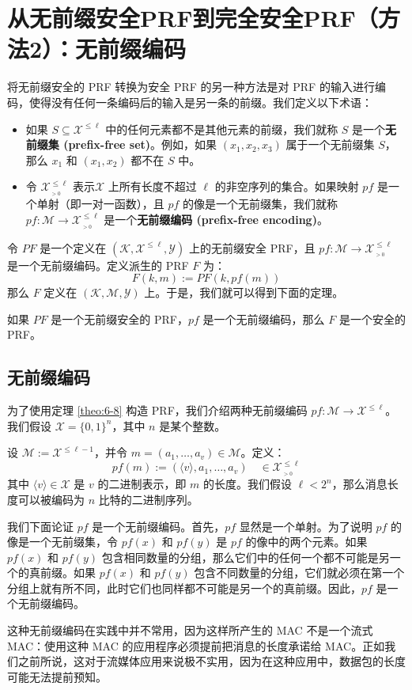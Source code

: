 \section{从无前缀安全PRF到完全安全PRF（方法2）：无前缀编码}\label{sec:6-6}

将无前缀安全的 PRF 转换为安全 PRF 的另一种方法是对 PRF 的输入进行编码，使得没有任何一条编码后的输入是另一条的前缀。我们定义以下术语：
\begin{itemize}
	\item 如果 $S\subseteq\mathcal{X}^{\leq\ell}$ 中的任何元素都不是其他元素的前缀，我们就称 $S$ 是一个\textbf{无前缀集 (prefix-free set)}。例如，如果 $(x_1,x_2,x_3)$ 属于一个无前缀集 $S$，那么 $x_1$ 和 $(x_1,x_2)$ 都不在 $S$ 中。
	\item 令 $\mathcal{X}^{\leq\ell}_{_{>0}}$ 表示$\mathcal{X}$ 上所有长度不超过 $\ell$ 的非空序列的集合。如果映射 $pf$ 是一个单射（即一对一函数），且 $pf$ 的像是一个无前缀集，我们就称 $pf:\mathcal{M}\to\mathcal{X}^{\leq\ell}_{_{>0}}$ 是一个\textbf{无前缀编码 (prefix-free encoding)}。
\end{itemize}

令 $PF$ 是一个定义在 $(\mathcal{K},\mathcal{X}^{\leq\ell},\mathcal{Y})$ 上的无前缀安全 PRF，且 $pf:\mathcal{M}\to\mathcal{X}^{\leq\ell}_{_{>0}}$ 是一个无前缀编码。定义派生的 PRF $F$ 为：
\[
F(k,m):=PF(k,pf(m))
\]
那么 $F$ 定义在 $(\mathcal{K},\mathcal{M},\mathcal{Y})$ 上。于是，我们就可以得到下面的定理。

\begin{theorem}\label{theo:6-8}
如果 $PF$ 是一个无前缀安全的 PRF，$pf$ 是一个无前缀编码，那么 $F$ 是一个安全的 PRF。
\end{theorem}

\subsection{无前缀编码}

为了使用定理 \ref{theo:6-8} 构造 PRF，我们介绍两种无前缀编码 $pf:\mathcal{M}\to\mathcal{X}^{\leq\ell}$。我们假设 $\mathcal{X}=\{0,1\}^n$，其中 $n$ 是某个整数。

\begin{snote}[方法 1：前置长度。]
设 $\mathcal{M}:=\mathcal{X}^{\leq\ell-1}$，并令 $m=(a_1,\dots,a_v)\in\mathcal{M}$。定义：
\[
pf(m):=(\langle v\rangle,a_1,\dots,a_v)\quad\in\mathcal{X}^{\leq\ell}_{_{>0}}
\]
其中 $\langle v\rangle\in\mathcal{X}$ 是 $v$ 的二进制表示，即 $m$ 的长度。我们假设 $\ell<2^n$，那么消息长度可以被编码为 $n$ 比特的二进制序列。

我们下面论证 $pf$ 是一个无前缀编码。首先，$pf$ 显然是一个单射。为了说明 $pf$ 的像是一个无前缀集，令 $pf(x)$ 和 $pf(y)$ 是 $pf$ 的像中的两个元素。如果 $pf(x)$ 和 $pf(y)$ 包含相同数量的分组，那么它们中的任何一个都不可能是另一个的真前缀。如果 $pf(x)$ 和 $pf(y)$ 包含不同数量的分组，它们就必须在第一个分组上就有所不同，此时它们也同样都不可能是另一个的真前缀。因此，$pf$ 是一个无前缀编码。

这种无前缀编码在实践中并不常用，因为这样所产生的 MAC 不是一个流式 MAC：使用这种 MAC 的应用程序必须提前把消息的长度承诺给 MAC。正如我们之前所说，这对于流媒体应用来说极不实用，因为在这种应用中，数据包的长度可能无法提前预知。
\end{snote}

